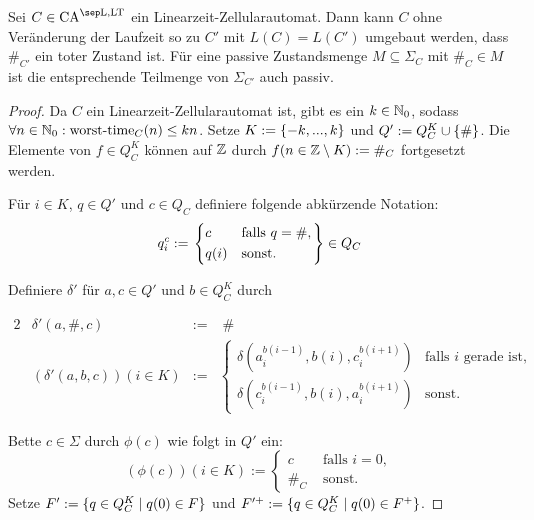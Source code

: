 \begin{satz}
    \label{satzRauteTot}
    Sei $C \in \CAM{\CALeft, \CALT}$ ein Linearzeit-Zellularautomat.
    Dann kann $C$ ohne Veränderung der Laufzeit so zu $C'$ mit $L(C) = L(C')$ umgebaut werden, dass $\#_{C'}$ ein toter Zustand ist.
    Für eine passive Zustandsmenge $M \subseteq \Sigma_C$ mit $\#_C \in M$ ist
    die entsprechende Teilmenge von $\Sigma_{C'}$ auch passiv.
\end{satz}
\begin{proof}
    Da $C$ ein Linearzeit-Zellularautomat ist, gibt
    es ein $k \in \mathbb{N}_0$, sodass $\forall n \in \mathbb{N}_0: \operatorname{worst-time}_C(n) \leq kn$.
    Setze $K := \{ {-k, ..., k} \}$ und  $Q' := Q_C^K \cup \{ { \# } \}$.
    Die Elemente von $f \in Q_C^K$ können auf $\mathbb{Z}$ durch $f(n \in \mathbb{Z} \setminus K) := \#_C$ fortgesetzt werden.

    Für $i \in K$, $q \in Q'$ und $c \in Q_C$ definiere folgende abkürzende Notation:
    \[
        q_i^c :=
        \begin{rcases}
            \begin{dcases}
                c & \text{falls } q = \#, \\
                q(i) & \text{sonst.}
            \end{dcases}
        \end{rcases}
        \in Q_C
    \]

    Definiere $\delta'$ für $a, c \in Q'$ und $b \in Q^K_C$ durch
    
    \begin{alignat*}{2}
        & \delta'(a, \#, c) & := & \; \# \\
        & (\delta'(a, b, c))(i \in K) & := &
        \begin{cases}
            \delta(a_i^{b(i - 1)}, b(i), c_i^{b(i + 1)}) & \text{falls } i \text{ gerade ist,} \\
            \delta(c_i^{b(i - 1)}, b(i), a_i^{b(i + 1)}) & \text{sonst.}
        \end{cases}
    \end{alignat*}
    
    Bette $c \in \Sigma$ durch $\phi(c)$ wie folgt in $Q'$ ein:
    \[
        (\phi(c))(i \in K) :=
        \begin{cases}
            c & \text{ falls } i = 0, \\
            \#_C & \text { sonst.}
        \end{cases}
    \]
    Setze $F' := \{ { q \in Q_C^K } \; | \; { q(0) \in F } \}$
    und $F'^+ := \{ { q \in Q_C^K } \; | \; { q(0) \in F^+ } \}$.
    

\end{proof}
